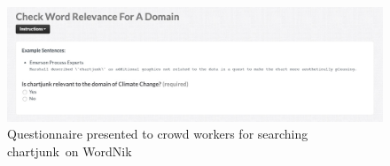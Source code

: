 \begin{figure}
	 \centering
	 \includegraphics[width=\textwidth]{screenshots/questionaire_wordnik_example}
	 \caption{Questionnaire presented to crowd workers for searching \guillemotright chartjunk\guillemotleft~on WordNik}\label{fig:wordnik_example_questionaire}
\end{figure}

